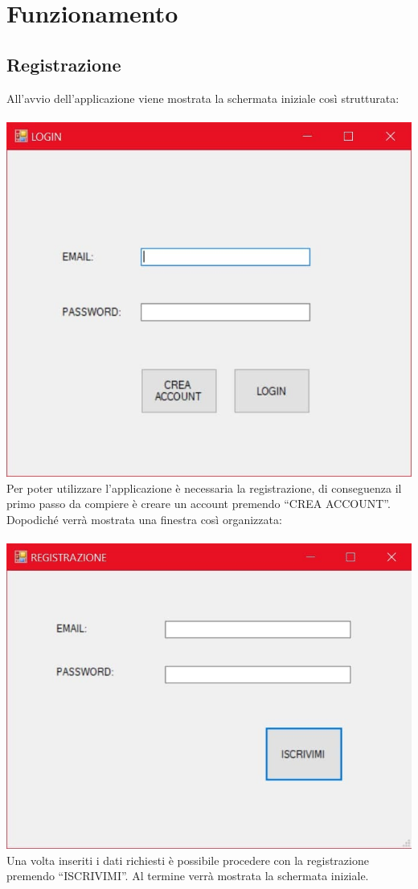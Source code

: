\documentclass[a4paper, titlepage]{article}
\begin{document}
\section{Funzionamento}
\subsection{Registrazione}
All’avvio dell’applicazione viene mostrata la schermata iniziale così strutturata:\\\\
\includegraphics[scale=0.30]{Immagini/form/Form Login.jpg}
\\Per poter utilizzare l’applicazione è necessaria la registrazione, di conseguenza il primo passo da compiere è creare un account premendo “CREA ACCOUNT”. Dopodiché verrà mostrata una finestra così organizzata:\\\\
\includegraphics[scale=0.30]{Immagini/form/Form Registrazione.jpg}
\\Una volta inseriti i dati richiesti è possibile procedere con la registrazione premendo “ISCRIVIMI”. Al termine verrà mostrata la schermata iniziale.
\newpage
\end{document}
